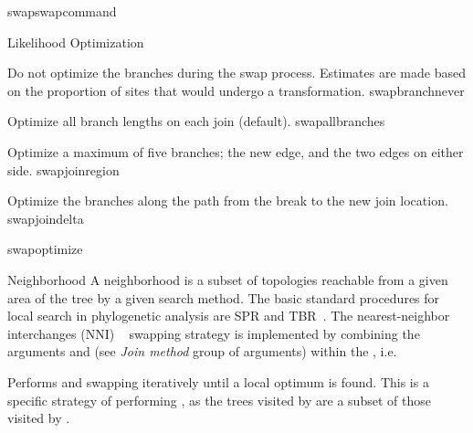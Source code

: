 \begin{command}{swap}{swapcommand}
\begin{arguments}
\begin{argumentgroup}{Likelihood Optimization}
{\begin{description}
                        {Do not optimize the branches during the swap process.
                        Estimates are made based on the proportion of sites that
                        would undergo a transformation.}
                        {swapbranchnever}

                        {Optimize all branch lengths on each join (default).}
                        {swapallbranches}

                        {Optimize a maximum of five branches; the new edge, and the two
                        edges on either side.}
                        {swapjoinregion}

                        {Optimize the branches along the path from the break to the
                        new join location.}
                        {swapjoindelta}

                \end{description} }
                {swapoptimize}

        \end{argumentgroup}

        \begin{argumentgroup}{Neighborhood}
            {A neighborhood is a subset of topologies reachable from a given 
            area of the tree by a given search method. The basic standard procedures for 
            local search in phylogenetic analysis are SPR and TBR~\cite{swofford1990}. 
            The nearest-neighbor interchanges (NNI) ~\cite{camin1965} swapping strategy is implemented 
            by combining the arguments  and 
            (see \emph{Join method} group of arguments) within the , 
            i.e. 
            }
            \label{swap_neigh}

                {Performs  and 
                swapping iteratively until a local optimum is found.
                This is a specific strategy of performing ,
                as the trees visited by  are a subset
                of those visited by .}
                {}


\end{argumentgroup}
\end{arguments}
\end{command}
